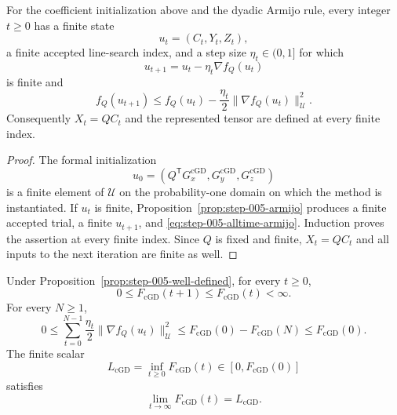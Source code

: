 \begin{proposition}\label{prop:step-005-well-defined}
For the coefficient initialization above and the dyadic Armijo rule, every
integer $t\ge0$ has a finite state
\[
 u_t=(C_t,Y_t,Z_t),
\]
a finite accepted line-search index, and a step size $\eta_t\in(0,1]$ for
which
\[
 u_{t+1}=u_t-\eta_t\nabla f_Q(u_t)
\]
is finite and
\[
 f_Q(u_{t+1})
 \le f_Q(u_t)-\frac{\eta_t}{2}
 \|\nabla f_Q(u_t)\|_{\mathcal U}^2.
 \tag{A.3}\label{eq:step-005-alltime-armijo}
\]
Consequently $X_t=QC_t$ and the represented tensor are defined at every
finite index.
\end{proposition}

\begin{proof}
The formal initialization
\[
 u_0=(Q^{\mathsf T}G_x^{\mathrm{cGD}},
 G_y^{\mathrm{cGD}},G_z^{\mathrm{cGD}})
\]
is a finite element of $\mathcal U$ on the probability-one domain on which
the method is instantiated.  If $u_t$ is finite,
Proposition~\ref{prop:step-005-armijo} produces a finite accepted trial,
a finite $u_{t+1}$, and \eqref{eq:step-005-alltime-armijo}.  Induction proves
the assertion at every finite index.  Since $Q$ is fixed and finite,
$X_t=QC_t$ and all inputs to the next iteration are finite as well.
\end{proof}

\begin{proposition}\label{prop:step-005-scalar-limit}
Under Proposition~\ref{prop:step-005-well-defined}, for every $t\ge0$,
\[
 0\le F_{\mathrm{cGD}}(t+1)\le F_{\mathrm{cGD}}(t)<\infty.
 \tag{A.4}\label{eq:step-005-monotone}
\]
For every $N\ge1$,
\[
 0\le\sum_{t=0}^{N-1}\frac{\eta_t}{2}
 \|\nabla f_Q(u_t)\|_{\mathcal U}^2
 \le F_{\mathrm{cGD}}(0)-F_{\mathrm{cGD}}(N)
 \le F_{\mathrm{cGD}}(0).
 \tag{A.5}\label{eq:step-005-budget}
\]
The finite scalar
\[
 L_{\mathrm{cGD}}=\inf_{t\ge0}F_{\mathrm{cGD}}(t)
 \in[0,F_{\mathrm{cGD}}(0)]
\]
satisfies
\[
 \lim_{t\to\infty}F_{\mathrm{cGD}}(t)=L_{\mathrm{cGD}}.
 \tag{A.6}\label{eq:step-005-limit}
\]
\end{proposition}

